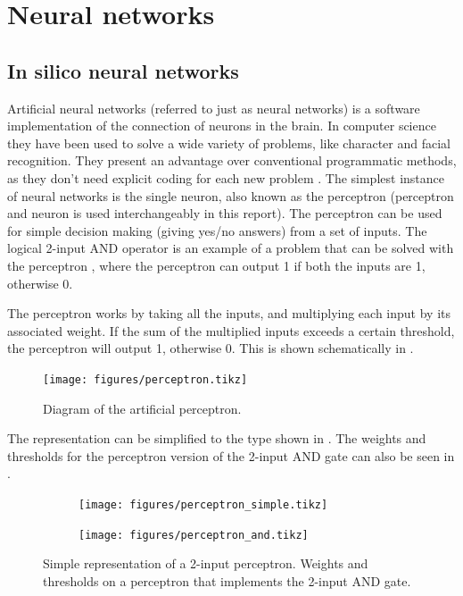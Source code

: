 \section{Neural networks}
\subsection{In silico neural networks}
Artificial neural networks (referred to just as neural networks) is a software implementation of the connection of neurons in the brain. In computer science they have been used to solve a wide variety of problems, like character and facial recognition. They present an advantage over conventional programmatic methods, as they don't need explicit coding for each new problem \cite{Tu1996}. The simplest instance of neural networks is the single neuron, also known as the perceptron \cite{Lippmann} (perceptron and neuron is used interchangeably in this report). The perceptron can be used for simple decision making (giving yes/no answers) from a set of inputs. The logical 2-input AND operator is an example of a problem that can be solved with the perceptron \cite{ZhaoYanling}, where the perceptron can output 1 if both the inputs are 1, otherwise 0.

The perceptron works by taking all the inputs, and multiplying each input by its associated weight. If the sum of the multiplied inputs exceeds a certain threshold, the perceptron will output 1, otherwise 0. This is shown schematically in .

\begin{figure}[h]
\texttt{[image: figures/perceptron.tikz]}
\caption{Diagram of the artificial perceptron.}
\label{perceptron}
\end{figure}

The representation can be simplified to the type shown in . The weights and thresholds for the perceptron version of the 2-input AND gate can also be seen in .

\begin{figure}[h]
  \begin{subfigure}[t]{.49\textwidth}
    \texttt{[image: figures/perceptron\_simple.tikz]}
    \caption{}
    \label{perceptron_simple_a}
  \end{subfigure}
  \quad
  \begin{subfigure}[t]{.49\textwidth}
    \texttt{[image: figures/perceptron\_and.tikz]}
    \caption{}
    \label{perceptron_simple_b}
  \end{subfigure}
  \caption{ Simple representation of a 2-input perceptron.  Weights and thresholds on a perceptron that implements the 2-input AND gate.}
  \label{perceptron_simple}
\end{figure}

